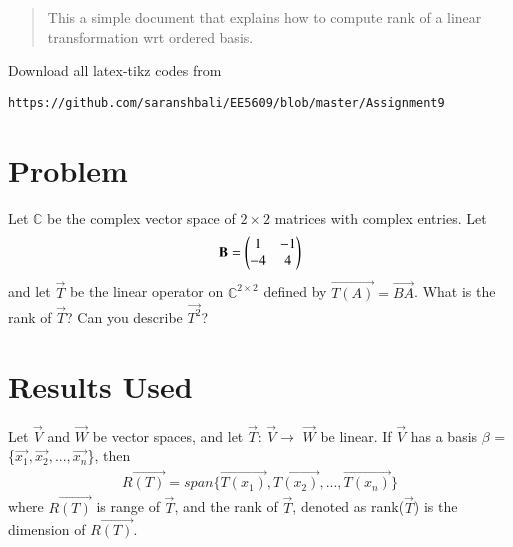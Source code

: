 \documentclass[journal,12pt,twocolumn]{IEEEtran}
\begin{document}
%
\begin{abstract}
This a simple document that explains how to compute rank of a linear transformation wrt ordered basis.
\end{abstract}
%
%
Download all latex-tikz codes from 
%
\begin{lstlisting}
https://github.com/saranshbali/EE5609/blob/master/Assignment9
\end{lstlisting}
%
\section{Problem}
Let $\mathbb{C}$ be the complex vector space of $2\times2$ matrices with complex entries. Let
\begin{align}
	\mathbf{B} = \begin{pmatrix}1 & -1 \\ -4 & 4\end{pmatrix}
\end{align}
and let $\vec{T}$ be the linear operator on $\mathbb{C}^{2\times2}$  defined by $\vec{T(A)} = \vec{BA}$. What is the rank of $\vec{T}$? Can you describe $\vec{T^2}$?   
\section{Results Used}
\begin{theorem}\label{1}
Let $\vec{V}$ and $\vec{W}$ be vector spaces, and let $\vec{T}$: $\vec{V}$$\to$ $\vec{W}$ be linear. If $\vec{V}$ has a basis $\beta$ = \{$\vec{x_1}, \vec{x_2},...,\vec{x_n}$\}, then
\begin{align}
R\vec{(T)} = span\{\vec{T(x_1)}, \vec{T(x_2)},...,\vec{T(x_n)}\} 
\end{align}
where $R\vec{(T)}$ is range of $\vec{T}$, and the rank of $\vec{T}$, denoted as rank($\vec{T}$) is the dimension of $R\vec{(T)}$. 
\end{theorem}
\end{document}
